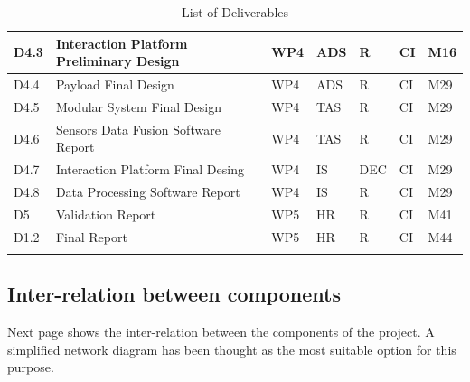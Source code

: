 \begin{longtable}[H]{p{1.8cm} >{\raggedright\arraybackslash}p{2.5cm} p{1.3cm} p{1.8cm} p{0.8cm} p{2.1cm} p{1.8cm}}
	\midrule
	
	D4.3 & Interaction Platform Preliminary Design  & WP4 & ADS & R & CI & M16 \vspace{0.2cm} \\

	\midrule

 	D4.4 & Payload Final Design & WP4 & ADS & R & CI & M29  \vspace{0.2cm} \\

 	\midrule

	D4.5 & Modular System  Final Design & WP4 & TAS & R & CI & M29  \vspace{0.2cm} \\
	
	\midrule
	
	D4.6 & Sensors Data Fusion Software Report  & WP4 & TAS & R & CI & M29  \vspace{0.2cm} \\

	\midrule

 	D4.7 & Interaction Platform Final Desing  & WP4 & IS & DEC & CI & M29 \vspace{0.2cm} \\

 	\midrule

	D4.8 & Data Processing Software Report & WP4 & IS & R & CI & M29  \vspace{0.2cm} \\
	
	\midrule
	
	D5 & Validation Report & WP5 & HR & R & CI & M41  \vspace{0.2cm} \\

	\midrule

 	D1.2 & Final Report & WP5 & HR & R & CI & M44 \vspace{0.2cm} \\
	
	\bottomrule[2pt]
	
	\caption{List of Deliverables}
	\label{Deliverables}
\end{longtable}

\subsection{Inter-relation between components}

Next page shows the inter-relation between the components of the project. A simplified network diagram has been thought as the most suitable option for this purpose. 


